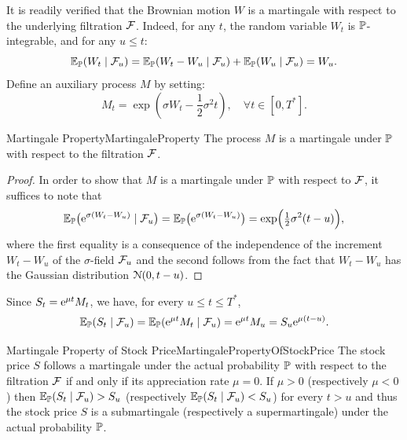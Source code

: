 It is readily verified that the Brownian motion \(W\) is a martingale with respect to the underlying filtration \(\mathcal{F}\). Indeed, for any \(t\), the random variable \(W_t\) is \(\mathbb{P}\)-integrable, and for any \(u \le t\):
\begin{equation} \label{eq:BrownianMartingaleProperty}
	\mathbb{E}_{\mathbb{P}}(W_t \mid \mathcal{F}_u) = \mathbb{E}_{\mathbb{P}}(W_t - W_u \mid \mathcal{F}_u) + \mathbb{E}_{\mathbb{P}}(W_u \mid \mathcal{F}_u) = W_u.
\end{equation}
Define an auxiliary process \(M\) by setting:
\begin{equation} \label{eq:AuxiliaryProcessM}
	M_t = \exp \left(\sigma W_t - \frac{1}{2}\sigma^2 t\right), \quad \forall t \in [0, T^*].
\end{equation}

\begin{lem}{Martingale Property}{MartingaleProperty}
	The process \(M\) is a martingale under \(\mathbb{P}\) with respect to the filtration \(\mathcal{F}\).
\end{lem}

\begin{proof}
	In order to show that \(M\) is a martingale under \(\mathbb{P}\) with respect to \(\mathcal{F}\), it suffices to note that
	\begin{equation} \label{eq:MartingaleCheck}
		\mathbb{E}_{\mathbb{P}} \bigl( \mathrm{e}^{\sigma (W_t - W_u)} \mid \mathcal{F}_u \bigr) = \mathbb{E}_{\mathbb{P}} \bigl( \mathrm{e}^{\sigma (W_t - W_u)} \bigr) = \exp \Bigl( \tfrac{1}{2} \sigma^2 (t - u) \Bigr),
	\end{equation}
	where the first equality is a consequence of the independence of the increment \(W_t - W_u\) of the \(\sigma\)-field \(\mathcal{F}_u\) and the second follows from the fact that \(W_t - W_u\) has the Gaussian distribution \(\EuScript{N}(0, t - u)\).
\end{proof}

Since \(S_t = \mathrm{e}^{\mu t} M_t\), we have, for every \(u \le t \le T^*\),
\begin{equation} \label{eq:StockExpectation}
	\mathbb{E}_{\mathbb{P}}(S_t \mid \mathcal{F}_u) = \mathbb{E}_{\mathbb{P}}(\mathrm{e}^{\mu t} M_t \mid \mathcal{F}_u) = \mathrm{e}^{\mu t} M_u = S_u \mathrm{e}^{\mu(t-u)}.
\end{equation}

\begin{cor}{Martingale Property of Stock Price}{MartingalePropertyOfStockPrice}
	The stock price \(S\) follows a martingale under the actual probability \(\mathbb{P}\) with respect to the filtration \(\mathcal{F}\) if and only if its appreciation rate \(\mu = 0\). If \(\mu > 0\) (respectively \(\mu < 0\)) then \(\mathbb{E}_{\mathbb{P}}(S_t \mid \mathcal{F}_u) > S_u\) (respectively \(\mathbb{E}_{\mathbb{P}}(S_t \mid \mathcal{F}_u) < S_u\)) for every \(t > u\) and thus the stock price \(S\) is a submartingale (respectively a supermartingale) under the actual probability \(\mathbb{P}\).
\end{cor}

